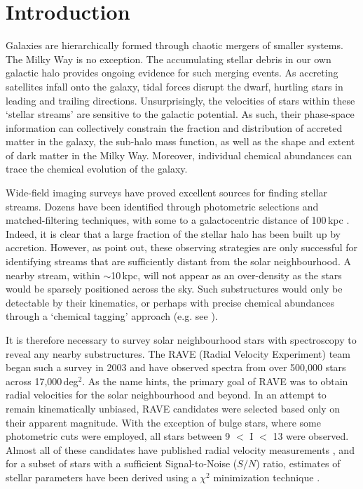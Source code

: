 \documentclass{emulateapj}
\begin{document}

\section{Introduction}
Galaxies are hierarchically formed through chaotic mergers of smaller systems. The Milky Way is no exception. The accumulating stellar debris in our own galactic halo provides ongoing evidence for such merging events. As accreting satellites infall onto the galaxy, tidal forces disrupt the dwarf, hurtling stars in leading and trailing directions. Unsurprisingly, the velocities of stars within these `stellar streams' are sensitive to the galactic potential. As such, their phase-space information can collectively constrain the fraction and distribution of accreted matter in the galaxy, the sub-halo mass function, as well as the shape and extent of dark matter in the Milky Way. Moreover, individual chemical abundances can trace the chemical evolution of the galaxy.
 
Wide-field imaging surveys have proved excellent sources for finding stellar streams. Dozens have been identified through photometric selections and matched-filtering techniques, with some to a galactocentric distance of 100\,kpc \citep{belokurov;et-al_2007,drake;et-al_2013}. Indeed, it is clear that a large fraction of the stellar halo has been built up by accretion. However, as \citet{helmi;white_1999} point out, these observing strategies are only successful for identifying streams that are sufficiently distant from the solar neighbourhood. A nearby stream, within $\sim$10\,kpc, will not appear as an over-density as the stars would be sparsely positioned across the sky. Such substructures would only be detectable by their kinematics, or perhaps with precise chemical abundances through a `chemical tagging' approach (e.g. see \citet{freeman;bland-hawthorn_2002}). 

It is therefore necessary to survey solar neighbourhood stars with spectroscopy to reveal any nearby substructures. The RAVE (Radial Velocity Experiment) team began such a survey in 2003 and have observed spectra from over 500,000 stars across 17,000\,deg$^{2}$. As the name hints, the primary goal of RAVE was to obtain radial velocities for the solar neighbourhood and beyond. In an attempt to remain kinematically unbiased, RAVE candidates were selected based only on their apparent magnitude. With the exception of bulge stars, where some photometric cuts were employed, all stars between 9 $<$ I $<$ 13 were observed. Almost all of these candidates have published radial velocity measurements \citep{steinmetz;et-al_2006}, and for a subset of stars with a sufficient Signal-to-Noise ($S/N$) ratio, estimates of stellar parameters have been derived using a $\chi^2$ minimization technique \citep{zwitter;et-al_2008, siebert;et-al_2011}. 
\end{document}
